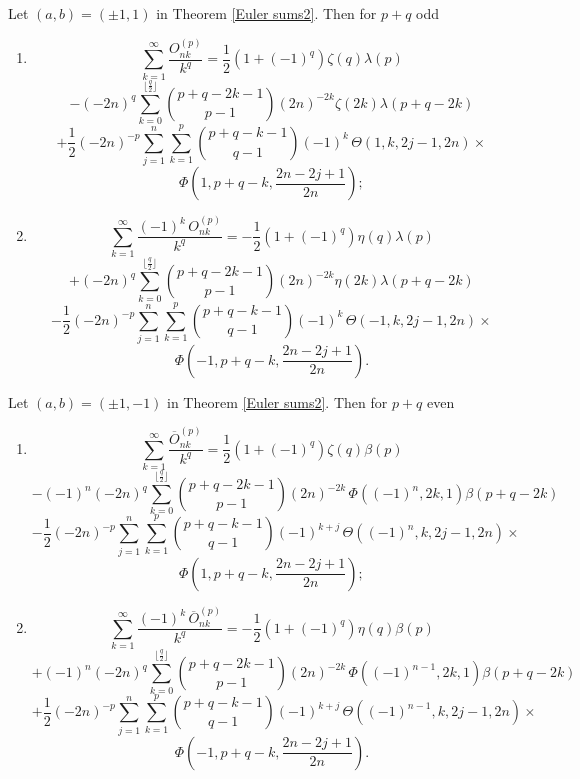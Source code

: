 \documentclass[11pt,reqno]{article}
\begin{document}
\begin{corollary} Let $(a,b)=(\pm1,1)$ in Theorem \ref{Euler sums2}. Then for $p+q$ odd
	\begin{enumerate}
		\item[i)]
		\[\sum_{k=1}^\infty\frac{ O_{nk}^{(p)}}{k^q}=\frac12(1+{(-1)}^{q})\zeta(q)\lambda(p)\]
		\[-{(-2n)}^{q}\sum_{k=0}^{\lfloor\frac{q}{2}\rfloor}\binom{p+q-2k-1}{p-1}{(2n)}^{-2k}\zeta(2k)\lambda(p+q-2k)\]
		\[+\frac12 {(-2n)}^{-p}\sum_{j=1}^{n}\sum_{k=1}^{p}\binom{p+q-k-1}{q-1}{(-1)}^{k}\,\Theta(1,k,2j-1,2n)\times\]
		\[\Phi\left(1,p+q-k,\frac{2n-2j+1}{2n}\right);\]
		\item[ii)]
		\[\sum_{k=1}^\infty\frac{{(-1)}^{k}\, O_{nk}^{(p)}}{k^q}=-\frac12(1+{(-1)}^{q})\eta(q)\lambda(p)\]
		\[+{(-2n)}^{q}\sum_{k=0}^{\lfloor\frac{q}{2}\rfloor}\binom{p+q-2k-1}{p-1}{(2n)}^{-2k}\eta(2k)\lambda(p+q-2k)\]
		\[-\frac12 {(-2n)}^{-p}\sum_{j=1}^{n}\sum_{k=1}^{p}\binom{p+q-k-1}{q-1}{(-1)}^{k}\,\Theta(-1,k,2j-1,2n)\times\]
		\[\Phi\left(-1,p+q-k,\frac{2n-2j+1}{2n}\right).\]
	\end{enumerate}
\end{corollary}
\begin{corollary}
	Let $(a,b)=(\pm1,-1)$ in Theorem \ref{Euler sums2}. Then for $p+q$ even
	\begin{enumerate}
		\item[i)]
		\[\sum_{k=1}^\infty\frac{\overline{O}_{nk}^{(p)}}{k^q}=\frac12(1+{(-1)}^{q})\zeta(q)\beta(p)\]
		\[-{(-1)}^{n}{(-2n)}^{q}\sum_{k=0}^{\lfloor\frac{q}{2}\rfloor}\binom{p+q-2k-1}{p-1}{(2n)}^{-2k}\,\Phi({(-1)}^{n},2k,1)\beta(p+q-2k)\]
		\[-\frac12 {(-2n)}^{-p}\sum_{j=1}^{n}\sum_{k=1}^{p}\binom{p+q-k-1}{q-1}{(-1)}^{k+j}\,\Theta({(-1)}^{n},k,2j-1,2n)\times\]
		\[\Phi\left(1,p+q-k,\frac{2n-2j+1}{2n}\right);\]
		\item[ii)]
		\[\sum_{k=1}^\infty\frac{{(-1)}^{k}\,\overline{O}_{nk}^{(p)}}{k^q}=-\frac12(1+{(-1)}^{q})\eta(q)\beta(p)\]
		\[+{(-1)}^{n}{(-2n)}^{q}\sum_{k=0}^{\lfloor\frac{q}{2}\rfloor}\binom{p+q-2k-1}{p-1}{(2n)}^{-2k}\,\Phi({(-1)}^{n-1},2k,1)\beta(p+q-2k)\]
		\[+\frac12{(-2n)}^{-p}\sum_{j=1}^{n}\sum_{k=1}^{p}\binom{p+q-k-1}{q-1}{(-1)}^{k+j}\,\Theta({(-1)}^{n-1},k,2j-1,2n)\times\]
		\[\Phi\left(-1,p+q-k,\frac{2n-2j+1}{2n}\right).\]
	\end{enumerate}
\end{corollary}
\end{document}
